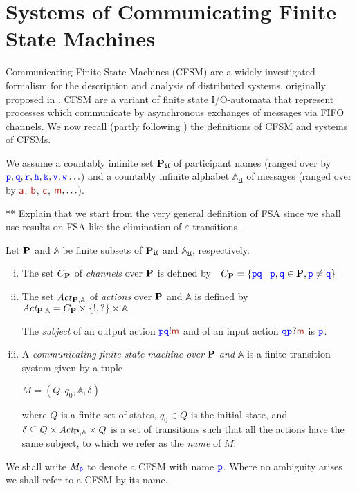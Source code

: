 \section{Systems of Communicating Finite State Machines}
\label{sect:cfsm}

Communicating Finite State Machines (CFSM)   are 
 a widely investigated
formalism for the description and analysis of distributed systems, originally proposed in \cite{BZ83}.
CFSM are a variant of finite state I/O-automata that represent processes which communicate by asynchronous exchanges of messages via FIFO channels. 
We now recall (partly following \cite{CF05,DY12,TY15,BdLH19}) the definitions of CFSM and systems of CFSMs.

We assume %
a countably infinite set  
$\mathbf{P}_\mathfrak{U}$ of participant names (ranged over by ${\mathtt{\color{blue}{ {p}}}},{\mathtt{\color{blue}{ {q}}}},{\mathtt{\color{blue}{ {r}}}},{\mathtt{\color{blue}{ {h}}}},{\mathtt{\color{blue}{ {k}}}},{\mathtt{\color{blue}{ {v}}}},{\mathtt{\color{blue}{ {w}}}}\ldots$) and a countably infinite alphabet $\mathbb{A}_\mathfrak{U}$ 
of messages (ranged over by $\msg[a]$, $\msg[b]$, $\msg[c]$, $\msg[m],\ldots$).\\

\begin{definition}
 
\end{definition}
** Explain that we start from the very general definition of FSA since we shall use results on FSA like
the elimination of $\varepsilon$-transitions-

\begin{definition}\label{def:cfsm}%
Let $\mathbf{P}$  and $\mathbb{A}$ be finite subsets of $\mathbf{P}_\mathfrak{U}$ and $\mathbb{A}_\mathfrak{U}$, respectively.
\begin{enumerate}[i)] 
\item
The set $C_{\mathbf{P}}$ of {\em channels} over $\mathbf{P}$ is defined by\ \
$C_{\mathbf{P}}=\{{\mathtt{\color{blue}{ {p}}}}{\mathtt{\color{blue}{ {q}}}} \mid { \ensuremath{\mathtt{\color{blue}{ {p}}}} },{\mathtt{\color{blue}{ {q}}}}\in \mathbf{P}, {\mathtt{\color{blue}{ {p}}}}\neq{ \ensuremath{\mathtt{\color{blue}{ {q}}}} }\}$
\item
The set $\mathit{Act}_{\mathbf{P},\mathbb{A}}$ of {\em actions}  over $\mathbf{P}$ and $\mathbb{A}$ is defined by\ 
$\textit{Act}_{\mathbf{P},\mathbb{A}} = C_{\mathbf{P}}\times\{!,?\}\times\mathbb{A}$

The {\em subject} of an output action $\ttp\ttq!\msg[m]$ and of an input action $\ttq\ttp?\msg[m]$ is 
${\mathtt{\color{blue}{ {p}}}}$.
\item
\label{def:cfsm-iii}
A {\em communicating finite state machine over} $\mathbf{P}$ \emph{and} $\mathbb{A}$
is a finite transition system given by a tuple\\
\centerline{ $M=(Q,q_0,\mathbb{A},\delta)$ }
where $Q$ is a finite set of states, $q_0\in Q$ is the initial state, and
$\delta\subseteq Q\times\textit{Act}_{\mathbf{P},\mathbb{A}}\times Q$ is a set of transitions
such that all the actions have the same subject, to which we refer as the {\em name} of $M$.
\end{enumerate}
\end{definition}
\noindent
We shall write $M_{{\mathtt{\color{blue}{ {p}}}}}$ to denote a CFSM with name ${\mathtt{\color{blue}{ {p}}}}$. 
Where no ambiguity arises we shall refer to a CFSM by its name.


